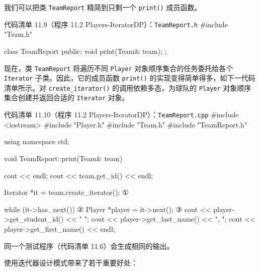 我们可以把类 \texttt{Team\allowbreak{}Report} 精简到只剩一个 \texttt{print()} 成员函数。

\begin{codeboxt}{代码清单 11.9（程序 11.2 Players-IteratorDP）：\texttt{Team\allowbreak{}Report.\allowbreak{}h}}
#include "Team.h"

class TeamReport
{
public:
    void print(Team& team);
};
\end{codeboxt}

现在，类 \texttt{Team\allowbreak{}Report} 将遍历不同 \texttt{Player} 对象顺序集合的任务委托给各个 \texttt{Iterator} 子类。因此，它的成员函数 \texttt{print()} 的实现变得简单得多，如下一代码清单所示。对 \texttt{create\_\allowbreak{}iterator(\allowbreak{})\allowbreak{}} 的调用依赖多态，为球队的 \texttt{Player} 对象顺序集合创建并返回合适的 \texttt{Iterator} 对象。

\begin{codeboxt}{代码清单 11.10（程序 11.2 Players-IteratorDP）：\texttt{Team\allowbreak{}Report.\allowbreak{}cpp}}
#include <iostream>
#include "Player.h"
#include "Team.h"
#include "TeamReport.h"

using namespace std;

void TeamReport::print(Team& team)
{
    cout << endl;
    cout << team.get_id() << endl;

    Iterator *it = team.create_iterator();  ①

    while (it->has_next())                  ②
    {
        Player *player = it->next();        ③
        cout << player->get_student_id() << " ";
        cout << player->get_last_name()  << ", ";
        cout << player->get_first_name() << endl;
    }
}
\end{codeboxt}
\par
{}\par
{}\par

同一个测试程序（代码清单 11.6）会生成相同的输出。


使用迭代器设计模式带来了若干重要好处：

